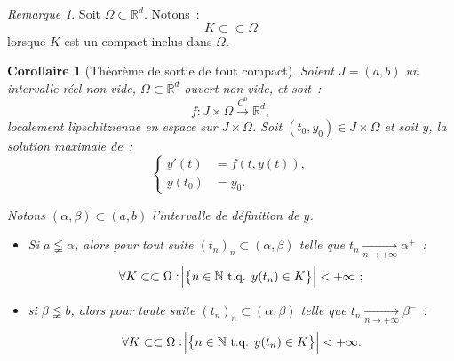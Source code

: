 \documentclass{report}
\newtheorem{cor}[thm]{Corollaire}
\theoremstyle{definition}
\theoremstyle{remark}
\newtheorem*{rmq}{Remarque}
\numberwithin{equation}{section}
\newcommand{\R}{\mathbb R}
\newcommand{\N}{\mathbb N}
\newcommand{\tq}{\text{ t.q. }}
\newcommand{\toC}[1]{\xrightarrow{C^{#1}}}
\newcommand{\pinfty}{{+\infty}}
\newcommand{\subscpct}{\subset\subset}
\begin{document}
			\begin{rmq} Soit $\Omega \subset \R^d$. Notons~:
			\begin{equation}
				K \subscpct \Omega
			\end{equation}
			lorsque $K$ est un compact inclus dans $\Omega$.
			\end{rmq}

			\begin{cor}[Théorème de sortie de tout compact] Soient $J = (a, b)$ un intervalle réel non-vide, $\Omega \subset \R^d$ ouvert non-vide, et soit~:
			\begin{equation}
				f : J \times \Omega \toC0 \R^d,
			\end{equation}
			localement lipschitzienne en espace sur $J \times \Omega$. Soit $(t_0, y_0) \in J \times \Omega$ et soit $y$, la solution maximale de~:
			\begin{equation}
				\begin{cases}
				y'(t) &= f(t, y(t)), \\
				y(t_0) &= y_0.
			\end{cases}
			\end{equation}

			Notons $(\alpha, \beta) \subset (a, b)$ l'intervalle de définition de $y$.

			\begin{itemize}
				\item Si $a \lneqq \alpha$, alors pour tout suite $(t_n)_n \subset (\alpha, \beta)$ telle que $t_n \xrightarrow[n \to \pinfty]{} \alpha^+$~:
				\begin{equation}
					\forall K \subscpct \Omega : \abs {\left\{n \in \N \tq y(t_n) \in K\right\}} < \pinfty~;
				\end{equation}
				\item si $\beta \lneqq b$, alors pour toute suite $(t_n)_n \subset (\alpha, \beta)$ telle que $t_n \xrightarrow[n \to \pinfty]{} \beta^-$~:
				\begin{equation}
					\forall K \subscpct \Omega : \abs {\left\{n \in \N \tq y(t_n) \in K\right\}} < \pinfty.
				\end{equation}
			\end{itemize}
			\end{cor}
\end{document}

